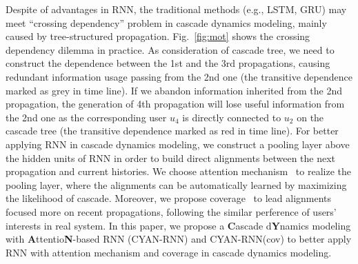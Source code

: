 Despite of advantages in RNN, the traditional methods (e.g., LSTM, GRU)
may meet ``crossing dependency'' problem in cascade dynamics modeling, mainly
caused by
tree-structured propagation. Fig.~\ref{fig:mot} shows the crossing
dependency dilemma in practice. 
As consideration of cascade tree, we need to construct the
dependence between the 1st and the 3rd propagations, causing redundant information usage passing
from the 2nd one (the transitive dependence marked as grey in time
line). If we abandon information inherited from the 2nd propagation, the
generation of 4th propagation will lose useful information from the 2nd
one as the corresponding user $u_4$ is directly connected to $u_2$ on the
cascade tree (the transitive dependence marked as red in time line). For better
applying RNN in cascade dynamics modeling, we construct a pooling layer
above the hidden units of RNN in order to build direct alignments between
the next propagation and current histories. We choose attention
mechanism~\cite{bahdanau2014neural} to realize the pooling layer, where the
alignments can be automatically learned by maximizing the likelihood of cascade.
Moreover, we propose coverage~\cite{tu2016modeling} to lead alignments focused
more on recent propagations, following the similar perference of users’ interests in
real system. 
In this paper, we propose a \textbf{C}ascade d\textbf{Y}namics
modeling with \textbf{A}ttentio\textbf{N}-based RNN (CYAN-RNN) and CYAN-RNN(cov)
to better apply RNN with attention mechanism and coverage in cascade dynamics
modeling.
